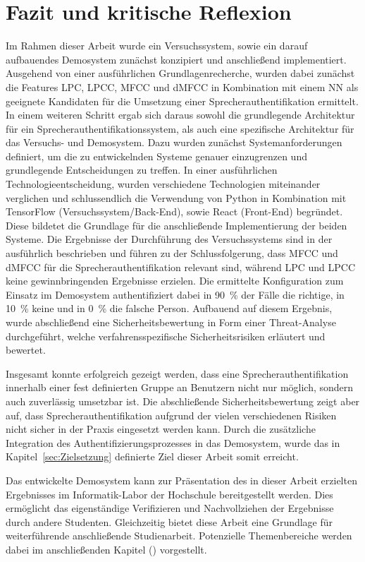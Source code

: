\section{Fazit und kritische Reflexion}
Im Rahmen dieser Arbeit wurde ein Versuchssystem, sowie ein darauf aufbauendes Demosystem zunächst konzipiert und anschließend implementiert.
Ausgehend von einer ausführlichen Grundlagenrecherche, wurden dabei zunächst die Features \ac{LPC}, \ac{LPCC}, \ac{MFCC} und \ac{dMFCC} in Kombination mit einem \ac{NN} als geeignete Kandidaten für die Umsetzung einer Sprecherauthentifikation ermittelt.
In einem weiteren Schritt ergab sich daraus sowohl die grundlegende Architektur für ein Sprecherauthentifikationssystem, als auch eine spezifische Architektur für das Versuchs- und Demosystem.
Dazu wurden zunächst Systemanforderungen definiert, um die zu entwickelnden Systeme genauer einzugrenzen und grundlegende Entscheidungen zu treffen.
In einer ausführlichen Technologieentscheidung, wurden verschiedene Technologien miteinander verglichen und schlussendlich die Verwendung von Python in Kombination mit TensorFlow (Versuchssystem/Back-End), sowie React (Front-End) begründet.
Diese bildetet die Grundlage für die anschließende Implementierung der beiden Systeme.
Die Ergebnisse der Durchführung des Versuchssystems sind in der  ausführlich beschrieben und führen zu der Schlussfolgerung, dass \ac{MFCC} und \ac{dMFCC} für die Sprecherauthentifikation relevant sind, während \ac{LPC} und \ac{LPCC} keine gewinnbringenden Ergebnisse erzielen.
Die ermittelte Konfiguration zum Einsatz im Demosystem authentifiziert dabei in 90~\% der Fälle die richtige, in 10~\% keine und in 0~\% die falsche Person.
Aufbauend auf diesem Ergebnis, wurde abschließend eine Sicherheitsbewertung in Form einer Threat-Analyse durchgeführt, welche verfahrensspezifische Sicherheitsrisiken erläutert und bewertet.

Insgesamt konnte erfolgreich gezeigt werden, dass eine Sprecherauthentifikation innerhalb einer fest definierten Gruppe an Benutzern nicht nur möglich, sondern auch zuverlässig umsetzbar ist.
Die abschließende Sicherheitsbewertung zeigt aber auf, dass Sprecherauthentifikation aufgrund der vielen verschiedenen Risiken nicht sicher in der Praxis eingesetzt werden kann.
Durch die zusätzliche Integration des Authentifizierungsprozesses in das Demosystem, wurde das in Kapitel~\ref{sec:Zielsetzung} definierte Ziel dieser Arbeit somit erreicht.

Das entwickelte Demosystem kann zur Präsentation des in dieser Arbeit erzielten Ergebnisses im Informatik-Labor der Hochschule bereitgestellt werden.
Dies ermöglicht das eigenständige Verifizieren und Nachvollziehen der Ergebnisse durch andere Studenten.
Gleichzeitig bietet diese Arbeit eine Grundlage für weiterführende anschließende Studienarbeit.
Potenzielle Themenbereiche werden dabei im anschließenden Kapitel () vorgestellt. 

